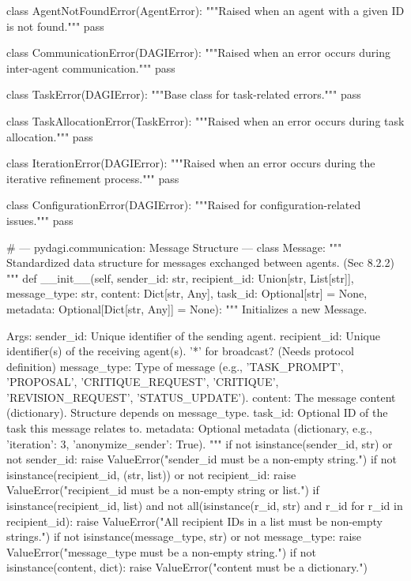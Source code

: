 \documentclass{amsbook}
\theoremstyle{definition}
\theoremstyle{remark}
\numberwithin{equation}{chapter} %
\begin{document}
\begin{python}
class AgentNotFoundError(AgentError):
    """Raised when an agent with a given ID is not found."""
    pass

class CommunicationError(DAGIError):
    """Raised when an error occurs during inter-agent communication."""
    pass

class TaskError(DAGIError):
    """Base class for task-related errors."""
    pass

class TaskAllocationError(TaskError):
    """Raised when an error occurs during task allocation."""
    pass

class IterationError(DAGIError):
    """Raised when an error occurs during the iterative refinement process."""
    pass

class ConfigurationError(DAGIError):
    """Raised for configuration-related issues."""
    pass

# --- pydagi.communication: Message Structure ---
class Message:
    """
    Standardized data structure for messages exchanged between agents. (Sec 8.2.2)
    """
    def __init__(self,
                 sender_id: str,
                 recipient_id: Union[str, List[str]],
                 message_type: str,
                 content: Dict[str, Any],
                 task_id: Optional[str] = None,
                 metadata: Optional[Dict[str, Any]] = None):
        """
        Initializes a new Message.

        Args:
            sender_id: Unique identifier of the sending agent.
            recipient_id: Unique identifier(s) of the receiving agent(s). '*' for broadcast? (Needs protocol definition)
            message_type: Type of message (e.g., 'TASK_PROMPT', 'PROPOSAL', 'CRITIQUE_REQUEST', 'CRITIQUE', 'REVISION_REQUEST', 'STATUS_UPDATE').
            content: The message content (dictionary). Structure depends on message_type.
            task_id: Optional ID of the task this message relates to.
            metadata: Optional metadata (dictionary, e.g., {'iteration': 3, 'anonymize_sender': True}).
        """
        if not isinstance(sender_id, str) or not sender_id:
            raise ValueError("sender_id must be a non-empty string.")
        if not isinstance(recipient_id, (str, list)) or not recipient_id:
             raise ValueError("recipient_id must be a non-empty string or list.")
        if isinstance(recipient_id, list) and not all(isinstance(r_id, str) and r_id for r_id in recipient_id):
             raise ValueError("All recipient IDs in a list must be non-empty strings.")
        if not isinstance(message_type, str) or not message_type:
            raise ValueError("message_type must be a non-empty string.")
        if not isinstance(content, dict):
            raise ValueError("content must be a dictionary.")


\end{python}
\end{document}
